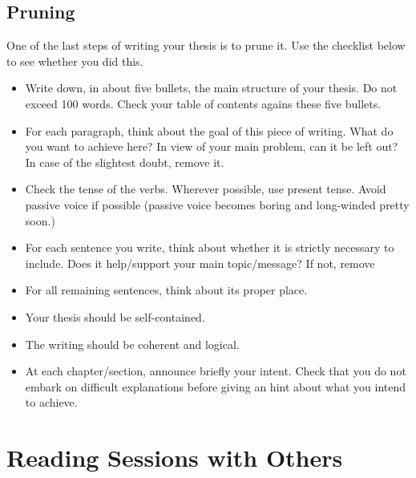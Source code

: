 \documentclass{article}
\begin{document}
\subsection{Pruning}
\label{sec:pruning}

One of the last steps of writing your thesis is to prune it. Use the
checklist below to see whether you did this.

\begin{itemize}
\item Write down, in about five bullets, the main structure of your
  thesis. Do not exceed 100 words. Check your table of contents agains
  these five bullets.
\item For each paragraph, think about the goal of this piece of
  writing. What do you want to achieve here? In view of your main
  problem, can it be left out? In case of the slightest doubt, remove
  it.
\item Check the tense of the verbs. Wherever possible, use present
  tense. Avoid passive voice if possible (passive voice becomes boring
  and long-winded pretty soon.)
\item For each sentence you write, think about whether it is strictly
  necessary to include. Does it help/support your main topic/message?
  If not, remove
\item For all remaining sentences, think about its proper place.
\item Your thesis should be self-contained.
\item The writing should be coherent and logical.
\item At each chapter/section, announce briefly your intent.  Check
  that you do not embark on difficult explanations before giving an
  hint about what you intend to achieve. 
\end{itemize}

\section{Reading Sessions with Others}
\label{sec:read-sess-with}
\end{document}
